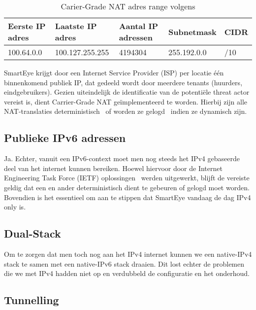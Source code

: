 \begin{table}[!htbp]
    \caption{Carier-Grade NAT adres range volgens \textcite{Weil2012}}
    \label{tab:Carrier-GradeNATAdressRanges}
    \begin{tabular}{lllll}
        \hline
        \multicolumn{1}{|l|}{Eerste IP adres} & \multicolumn{1}{l|}{Laatste IP adres} & \multicolumn{1}{l|}{Aantal IP adressen} & \multicolumn{1}{l|}{Subnetmask} & \multicolumn{1}{l|}{CIDR} \\ \hline
        100.64.0.0                            & 100.127.255.255                     & 4194304                                       & 255.192.0.0                   & /10
    \end{tabular}
\end{table}

SmartEye krijgt door een Internet Service Provider (ISP) per locatie één binnenkomend publiek IP, dat gedeeld wordt door meerdere tenants (huurders, eindgebruikers). Gezien uiteindelijk de identificatie van de potentiële threat actor vereist is, dient Carrier-Grade NAT geïmplementeerd te worden. Hierbij zijn alle NAT-translaties deterministisch~\autocite{Donley2014} of worden ze gelogd~\autocite{Perreault2013} indien ze dynamisch zijn.

\subsection{Publieke IPv6 adressen}
Ja. Echter, vanuit een IPv6-context moet men nog steeds het IPv4 gebaseerde deel van het internet kunnen bereiken. Hoewel hiervoor door de Internet Engineering Task Force (IETF) oplossingen~\autocite{Arkko2011} werden uitgewerkt, blijft de vereiste geldig dat een en ander deterministisch dient te gebeuren of gelogd moet worden. Bovendien is het essentieel om aan te stippen dat SmartEye vandaag de dag IPv4 only is.

\subsection{Dual-Stack}
Om te zorgen dat men toch nog aan het IPv4 internet kunnen  we een native-IPv4 stack te samen met een native-IPv6 stack  draaien. Dit lost echter de problemen die we met IPv4 hadden niet op en verdubbeld de configuratie en het onderhoud.

\subsection{Tunnelling}
